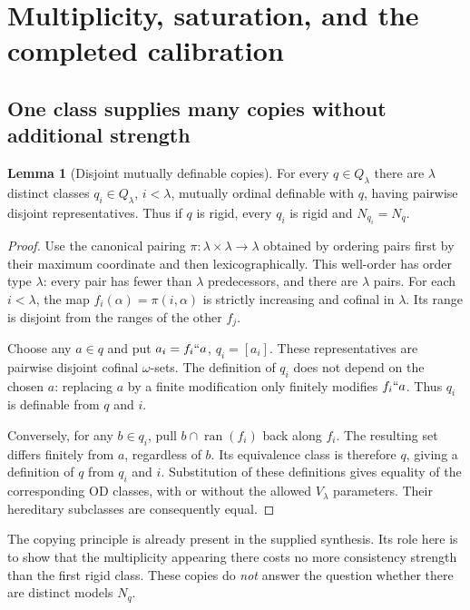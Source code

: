 \documentclass[11pt,letterpaper]{article}
\theoremstyle{definition}
\newtheorem{lemma}[definition]{Lemma}
\numberwithin{equation}{section}
\newcommand{\OD}{\mathrm{OD}}
\newcommand{\ran}{\operatorname{ran}}
\begin{document}
\section{Multiplicity, saturation, and the completed calibration}\label{sec:calibration}

\subsection{One class supplies many copies without additional strength}

\begin{lemma}[Disjoint mutually definable copies]\label{lem:copies}
For every $q\in Q_\lambda$ there are $\lambda$ distinct classes
$q_i\in Q_\lambda$, $i<\lambda$, mutually ordinal definable with $q$,
having pairwise disjoint representatives. Thus if $q$ is rigid, every
$q_i$ is rigid and $N_{q_i}=N_q$.
\end{lemma}
\begin{proof}
Use the canonical pairing $\pi:\lambda\times\lambda\to\lambda$ obtained
by ordering pairs first by their maximum coordinate and then
lexicographically. This well-order has order type $\lambda$: every pair
has fewer than $\lambda$ predecessors, and there are $\lambda$ pairs.
For each $i<\lambda$, the map $f_i(\alpha)=\pi(i,\alpha)$ is strictly
increasing and cofinal in $\lambda$. Its range is disjoint from the ranges
of the other $f_j$.

Choose any $a\in q$ and put $a_i=f_i``a$, $q_i=[a_i]$.
These representatives are pairwise disjoint cofinal $\omega$-sets.
The definition of $q_i$ does not depend on the chosen $a$: replacing $a$
by a finite modification only finitely modifies $f_i``a$. Thus $q_i$ is
definable from $q$ and $i$.

Conversely, for any $b\in q_i$, pull $b\cap\ran(f_i)$ back along $f_i$.
The resulting set differs finitely from $a$, regardless of $b$.
Its equivalence class is therefore $q$, giving a definition of $q$ from
$q_i$ and $i$. Substitution of these definitions gives equality of the
corresponding $\OD$ classes, with or without the allowed $V_\lambda$
parameters. Their hereditary subclasses are consequently equal.
\end{proof}

The copying principle is already present in the supplied synthesis. Its
role here is to show that the multiplicity appearing there costs no more
consistency strength than the first rigid class. These copies do \emph{not}
answer the question whether there are distinct models $N_q$.
\end{document}
